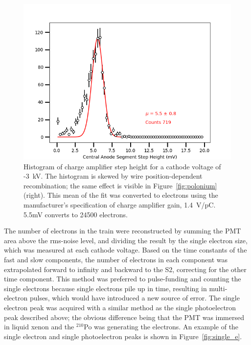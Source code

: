 \begin{figure}[htbp]
\begin{center}
\includegraphics[width=\textwidth]{figures/etrains/charge_hist.png}
\caption{Histogram of charge amplifier step height for a cathode voltage of -3~kV. The histogram is skewed by wire position-dependent recombination; the same effect is visible in Figure~\ref{fig:polonium} (right). This mean of the fit was converted to electrons using the manufacturer's specification of charge amplifier gain, 1.4~V/pC. 5.5mV converts to 24500 electrons.}
\label{fig:charge_hist}
\end{center}
\end{figure}

The number of electrons in the train were reconstructed by summing the \ac{PMT} area above the rms-noise level, and dividing the result by the single electron size, which was measured at each cathode voltage. Based on the time constants of the fast and slow components, the number of electrons in each component was extrapolated forward to infinity and backward to the S2, correcting for the other time component. This method was preferred to pulse-funding and counting the single electrons because single electrons pile up in time, resulting in multi-electron pulses, which would have introduced a new source of error. The single electron peak was acquired with a similar method as the single photoelectron peak described above; the obvious difference being that the \ac{PMT} was immersed in liquid xenon and the $^{210}$Po was generating the electrons. An example of the single electron and single photoelectron peaks is shown in Figure~\ref{fig:single_e}.


